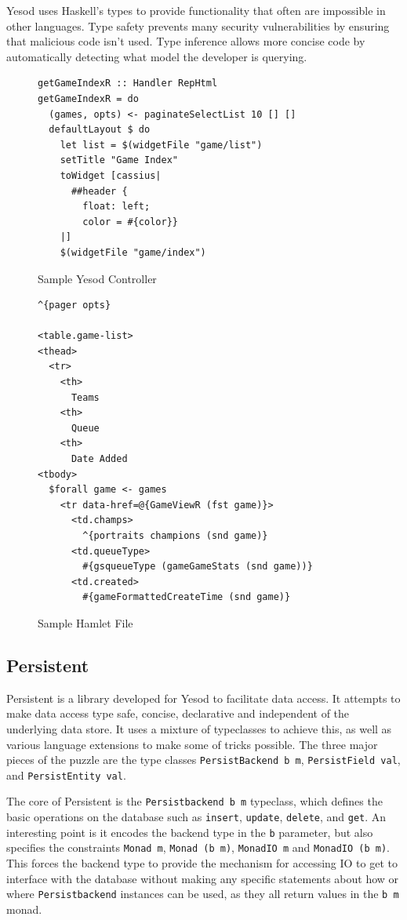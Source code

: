 \documentclass[letterpaper,twocolumn,9pt]{article}
\newcommand{\code}[1]{\texttt{#1}}
\begin{document}
Yesod uses Haskell's types to provide functionality that often are impossible in other languages. Type safety prevents many security vulnerabilities by ensuring that malicious code isn't used. Type inference allows more concise code by automatically detecting what model the developer is querying.


\begin{figure}[]
\footnotesize{
\begin{verbatim}
getGameIndexR :: Handler RepHtml
getGameIndexR = do
  (games, opts) <- paginateSelectList 10 [] []
  defaultLayout $ do
    let list = $(widgetFile "game/list")
    setTitle "Game Index"
    toWidget [cassius|
      ##header {
        float: left;
        color = #{color}}
    |]
    $(widgetFile "game/index")
\end{verbatim}
}
    \caption{Sample Yesod Controller}
    \label{controller}
\end{figure}

\begin{figure}[]
\footnotesize{
\begin{verbatim}
^{pager opts}

<table.game-list>
<thead>
  <tr>
    <th>
      Teams
    <th>
      Queue
    <th>
      Date Added
<tbody>
  $forall game <- games
    <tr data-href=@{GameViewR (fst game)}>
      <td.champs>
        ^{portraits champions (snd game)}
      <td.queueType>
        #{gsqueueType (gameGameStats (snd game))}
      <td.created>
        #{gameFormattedCreateTime (snd game)}
\end{verbatim}
}
    \caption{Sample Hamlet File}
    \label{hamlet}
\end{figure}

\subsection{Persistent}

Persistent is a library developed for Yesod to facilitate data access.  It attempts to make data access type safe, concise, declarative and independent of the underlying data store.  It uses a mixture of typeclasses to achieve this, as well as various language extensions to make some of tricks possible.  The three major pieces of the puzzle are the type classes \code{PersistBackend b m}, \code{PersistField val}, and \code{PersistEntity val}.

The core of Persistent is the \code{Persistbackend b m} typeclass, which defines the basic operations on the database such as \code{insert}, \code{update}, \code{delete}, and \code{get}.  An interesting point is it encodes the backend type in the \code{b} parameter, but also specifies the constraints \code{Monad m}, \code{Monad (b m)}, \code{MonadIO m} and \code{MonadIO (b m)}.  This forces the backend type to provide the mechanism for accessing IO to get to interface with the database without making any specific statements about how or where \code{Persistbackend} instances can be used, as they all return values in the \code{b m} monad.
\end{document}
